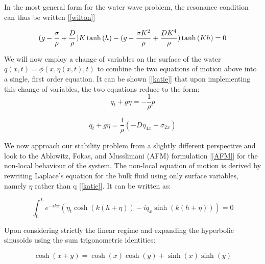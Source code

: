 \documentclass{article}
\begin{document}
In the most general form for the water wave problem, the resonance condition can thus be written [\ref{wilton}]

\begin{equation} \label{resonancegen}
(g - \frac{\sigma}{\rho} + \frac{D}{\rho})K\tanh{(h)} - (g - \frac{\sigma K^2}{\rho} + \frac{DK^4}{\rho})\tanh{(Kh)} = 0 
 \\
\end{equation}


We will now employ a change of variables on the surface of the water \(q(x,t) = \phi(x,\eta(x,t),t) \) to combine the two equations of motion above into a single, first order equation. It can be shown [\ref{katie}] that upon implementing this change of variables, the two equations reduce to the form:\\

\begin{equation} \label{no}
q_{t} + g\eta = -\frac{1}{\rho}p
\end{equation}


\begin{equation} \label{local}
q_{t} + g\eta = \frac{1}{\rho}( -D\eta_{4x} - \sigma_{2x} )
\end{equation}

\vspace{10}

We now approach our stability problem from a slightly different perspective and look to the Ablowitz, Fokas, and Musslimani (AFM) formulation [\ref{AFM}] for the non-local behaviour of the system. The non-local equation of motion is derived by rewriting Laplace's equation for the bulk fluid using only surface variables, namely \(\eta\) rather than q [\ref{katie}]. It can be written as:


\begin{equation} \label{no}
\int_{0}^{L} e^{-ikx}(\eta_{t}\cosh(k(h+\eta)) - iq_{x}\sinh(k(h+\eta))) = 0
\end{equation}

Upon considering strictly the linear regime and expanding the hyperbolic sinusoids using the sum trigonometric identities:

\begin{equation} \label{no} 
\cosh(x+y) = \cosh(x)\cosh(y) + \sinh(x)\sinh(y) 
\end{equation}
\end{document}
